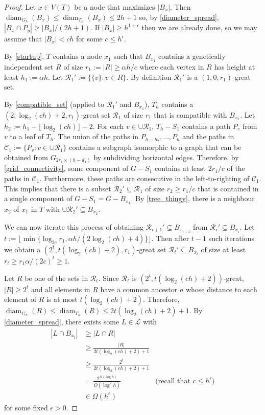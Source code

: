 \documentclass{patmorin}
\DeclareMathOperator{\diam}{diam}
\begin{document}
\begin{proof}
  Let $x\in V(T)$ be a node that maximizes $|B_x|$.  Then $\diam_{G_h}(B_x)\le\diam_{T_h}(B_x) \le 2h+1$ so, by \cref{diameter_spread}, $|B_x\cap P_y|\ge |B_x|/(2h+1)$.  If $|B_x|\ge h^{1+\epsilon}$ then we are already done, so we may assume that $|B_x| < ch$ for some $c \le h^{\epsilon}$.

  By \cref{startup}, $T$ contains a node $x_1$ such that $B_{x_1}$ contains a genetically independent set $R$ of size $r_1:=|R|\ge \alpha h/c$ where each vertex in $R$ has height at least $h_1:=\alpha h$.  Let  $\mathcal{R}_1':=\{\{v\}:v\in R\}$.  By definition $\mathcal{R}_1'$ is a $(1,0,r_1)$-great set.

  By \cref{compatible_set} (applied to $\mathcal{R}_1'$ and $B_{x_1}$), $T_h$ contains a $(2,\log_2(ch)+2,r_1)$-great set $\mathcal{R}_1$ of size $r_1$ that is compatible with $B_{x_1}$.  Let $h_2:=h_1-\lfloor\log_2(ch)\rfloor -2$.  For each $v\in\cup\mathcal{R}_1$, $T_h-S_1$ contains a path $P_v$ from $v$ to a leaf of $T_h$.  The union of the paths in $P_{h-h_2},\ldots,P_{h}$ and the paths in $\mathcal{C}_1:=\{P_v:v\in\cup\mathcal{R}_1\}$ contains a subgraph isomorphic to a graph that can be obtained from $G_{2r_1\times (h-d_1)}$ by subdividing horizontal edges.  Therefore, by \cref{grid_connectivity}, some component of $G-S_1$ contains at least $2r_1/c$ of the paths in $\mathcal{C}_1$.  Furthermore, these paths are consecutive in the left-to-righting of $\mathcal{C}_1$.  This implies that there is a subset $\mathcal{R}_2'\subseteq \mathcal{R}_1$ of size $r_2\ge r_1/c$ that is contained in a single component of $G-S_1=G-B_{x_1}$. By \cref{tree_thingy}, there is a neighbour $x_2$ of $x_1$ in $T$ with $\cup\mathcal{R}_2'\subseteq B_{x_2}$.

  We can now iterate this process of obtaining $\mathcal{R}_{i+1}'\subseteq B_{x_{i+1}}$ from $\mathcal{R}_i'\subseteq B_{x_i}$. Let $t:= \lfloor \min\{\log_{2c} r_1,\alpha h/(2\log_2(ch)+4)\}\rfloor$. Then after $t-1$ such iterations we obtain a $(2^t,t(\log_2(ch)+2),r_1)$-great set $\mathcal{R}_t'\subseteq B_{x_t}$ of size at least $r_t \ge r_1\alpha/(2c)^t \ge 1$.

  Let $R$ be one of the sets in $\mathcal{R}_t$.  Since $\mathcal{R}_t$ is $(2^t,t(\log_2(ch)+2))$-great, $|R|\ge 2^t$ and all elements in $R$ have a common ancestor $a$ whose distance to each element of $R$ is at most $t(\log_2(ch)+2)$.  Therefore, $\diam_{G_h}(R)\le\diam_{T_h}(R)\le 2t(\log_2(ch)+2)+1$. By \cref{diameter_spread}, there exists some $L\in\mathcal{L}$ with
  \begin{align*}
    |L\cap B_{x_t}| 
    & \ge |L\cap R| \\
    & \ge \frac{|R|}{2t(\log_2(ch)+2)+1} \\ 
    & \ge \frac{2^t}{2t(\log_2(ch)+2)+1} \\
    & = \frac{2^{\Omega(\log h)}}{O(\log^2 h)} & \text{(recall that $c\le h^{\epsilon}$)} \\
    & \in \Omega(h^\epsilon) 
  \end{align*}
  for some fixed $\epsilon >0$.
\end{proof}
\end{document}
